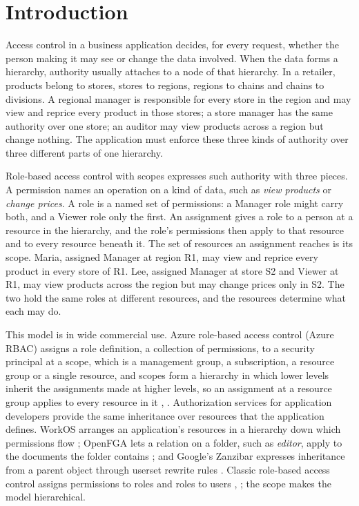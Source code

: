 \documentclass[conference]{IEEEtran}
\begin{document}
\section{Introduction}\label{sec-1}

Access control in a business application decides, for every request, whether the person making it may see or change the data involved. When the data forms a hierarchy, authority usually attaches to a node of that hierarchy. In a retailer, products belong to stores, stores to regions, regions to chains and chains to divisions. A regional manager is responsible for every store in the region and may view and reprice every product in those stores; a store manager has the same authority over one store; an auditor may view products across a region but change nothing. The application must enforce these three kinds of authority over three different parts of one hierarchy.

Role-based access control with scopes expresses such authority with three pieces. A permission names an operation on a kind of data, such as \emph{view products} or \emph{change prices}. A role is a named set of permissions: a Manager role might carry both, and a Viewer role only the first. An assignment gives a role to a person at a resource in the hierarchy, and the role's permissions then apply to that resource and to every resource beneath it. The set of resources an assignment reaches is its scope. Maria, assigned Manager at region R1, may view and reprice every product in every store of R1. Lee, assigned Manager at store S2 and Viewer at R1, may view products across the region but may change prices only in S2. The two hold the same roles at different resources, and the resources determine what each may do.

This model is in wide commercial use. Azure role-based access control (Azure RBAC) assigns a role definition, a collection of permissions, to a security principal at a scope, which is a management group, a subscription, a resource group or a single resource, and scopes form a hierarchy in which lower levels inherit the assignments made at higher levels, so an assignment at a resource group applies to every resource in it \cite{ref1}, \cite{ref2}. Authorization services for application developers provide the same inheritance over resources that the application defines. WorkOS arranges an application's resources in a hierarchy down which permissions flow \cite{ref3}; OpenFGA lets a relation on a folder, such as \emph{editor}, apply to the documents the folder contains \cite{ref4}; and Google's Zanzibar expresses inheritance from a parent object through userset rewrite rules \cite{ref5}. Classic role-based access control assigns permissions to roles and roles to users \cite{ref6}, \cite{ref7}; the scope makes the model hierarchical.
\end{document}
